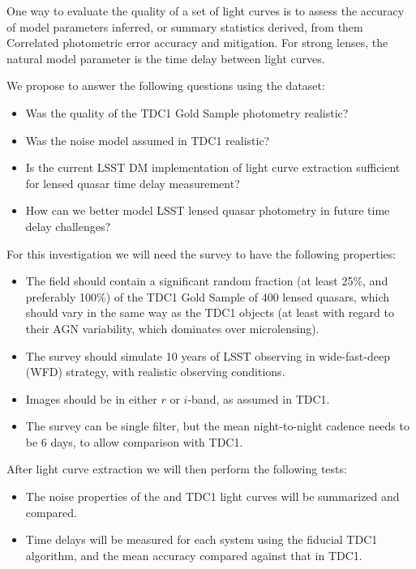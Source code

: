 One way to evaluate the quality of a set of light curves is to assess the accuracy of
model parameters inferred, or summary statistics derived, from them
Correlated photometric error accuracy and mitigation. For strong lenses,
the natural model parameter is the time delay between light curves.

We propose to answer the following questions using the \TwinklesOne dataset:
\begin{itemize}
\item Was the quality of the TDC1 Gold Sample photometry realistic?
\item Was the noise model assumed in TDC1 realistic?
\item Is the current LSST DM implementation of light curve extraction
      sufficient for lensed quasar time delay measurement?
\item How can we better model LSST lensed quasar photometry in
      future time delay challenges?
\end{itemize}

For this investigation we will need the \TwinklesOne survey to have the following
properties:
\begin{itemize}
\item The field should contain a significant random fraction (at least
25\%,  and preferably 100\%) of the TDC1 Gold Sample of 400 lensed
quasars,  which should vary in the same way as the TDC1 objects (at
least with regard to their  AGN variability, which dominates over
microlensing).
\item The survey should simulate 10 years of LSST observing in
wide-fast-deep (WFD) strategy, with realistic observing conditions.
\item Images should be in either $r$ or $i$-band, as assumed in TDC1.
\item The survey can be single filter, but the mean night-to-night
cadence needs to be 6 days, to allow comparison with TDC1.
\end{itemize}

After light curve extraction we will then perform the following tests:
\begin{itemize}
\item The noise properties of the \TwinklesOne and TDC1 light curves
will be summarized and compared.
\item Time delays will be measured for each system using the fiducial
TDC1 algorithm, and the mean accuracy compared against that in TDC1.
\end{itemize}


